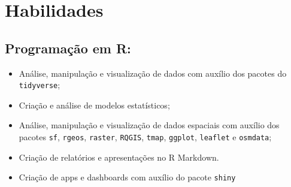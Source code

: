 \documentclass[12pt, a4paper]{article}
\begin{document}





\section{Habilidades}

\subsection{Programação em R:}

\begin{itemize}
   \item Análise, manipulação e visualização de dados com auxílio dos pacotes do \verb|tidyverse|;
   \item Criação e análise de modelos estatísticos;
   \item Análise, manipulação e visualização de dados espaciais com auxílio dos pacotes \verb|sf|, \verb|rgeos|, \verb|raster|, \verb|RQGIS|, \verb|tmap|, \verb|ggplot|, \verb|leaflet| e \verb|osmdata|;
   \item Criação de relatórios e apresentações no R Markdown. 
   \item Criação de apps e dashboards com auxílio do pacote \verb|shiny|
\end{itemize}
\end{document}
